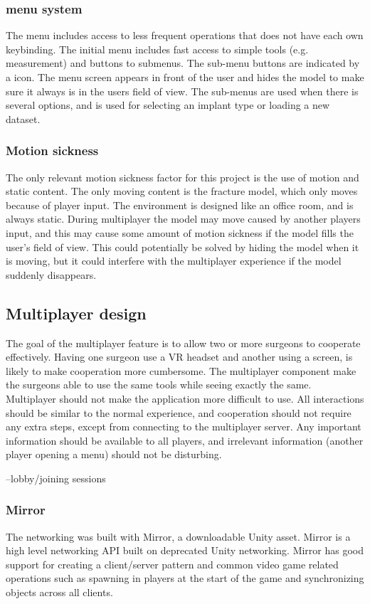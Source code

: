 \documentclass[a4paper]{report}
\begin{document}
\subsubsection{menu system}
The menu includes access to less frequent operations that does not have each own keybinding. The initial menu includes fast access to simple tools (e.g. measurement) and buttons to submenus. The sub-menu buttons are indicated by a icon. The menu screen appears in front of the user and hides the model to make sure it always is in the users field of view.
The sub-menus are used when there is several options, and is used for selecting an implant type or loading a new dataset.

\subsubsection{Motion sickness}
The only relevant motion sickness factor for this project is the use of motion and static content. The only moving content is the fracture model, which only moves because of player input. The environment is designed like an office room, and is always static.
During multiplayer the model may move caused by another players input, and this may cause some amount of motion sickness if the model fills the user's field of view. This could potentially be solved by hiding the model when it is moving, but it could interfere with the multiplayer experience if the model suddenly disappears.


\subsection{Multiplayer design}
The goal of the multiplayer feature is to allow two or more surgeons to cooperate effectively. Having one surgeon use a VR headset and another using a screen, is likely to make cooperation more cumbersome. The multiplayer component make the surgeons able to use the same tools while seeing exactly the same.
Multiplayer should not make the application more difficult to use. All interactions should be similar to the normal experience, and cooperation should not require any extra steps, except from connecting to the multiplayer server. Any important information should be available to all players, and irrelevant information (another player opening a menu) should not be disturbing.

--lobby/joining sessions

\subsubsection{Mirror}
The networking was built with Mirror, a downloadable Unity asset. Mirror is a high level networking API built on deprecated Unity networking\cite{noauthor_mirror_nodate}. Mirror has good support for creating a client/server pattern and common video game related operations such as spawning in players at the start of the game and synchronizing objects across all clients.
\end{document}
